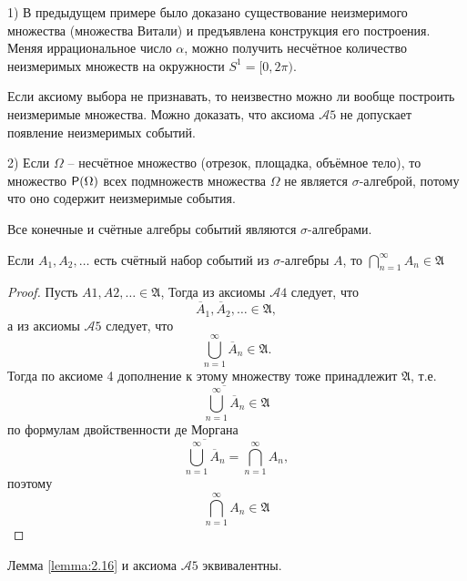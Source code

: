 \begin{zam}
	\label{zam:2.14}
1) В предыдущем примере было доказано существование неизмеримого множества (множества Витали) и предъявлена конструкция его построения. Меняя иррациональное число $\alpha$, можно получить несчётное количество неизмеримых множеств на окружности $S^1 = [0, 2\pi)$. 

Если аксиому выбора не признавать, то неизвестно можно ли вообще построить неизмеримые множества. Можно доказать, что аксиома $\mathcal{A}5$ не допускает появление неизмеримых событий.

2) Если $\Omega$ -- несчётное множество (отрезок, площадка, объёмное тело), то множество $\P(\Omega)$ всех подмножеств множества $\Omega$ не является $\sigma$-алгеброй, потому что оно содержит неизмеримые события.
\end{zam}

\begin{zam}
	\label{zam:2.15}
Все конечные и счётные алгебры событий являются $\sigma$-алгебрами.
\end{zam}

\begin{lemma}
	\label{lemma:2.16}
Если ${A_1 , A_2 , \ldots }$ есть счётный набор событий из $\sigma$-алгебры $A$, то $\bigcap\limits_{n=1}^\infty A_n\in\mathfrak{A}$
\end{lemma}

\begin{proof}
Пусть $A1 , A2 , \ldots \in \mathfrak{A}$, Тогда из аксиомы $\mathcal{A}4$ следует, что
	\begin{equation*}
		\overline{A}_1,\overline{A}_2, \ldots \in \mathfrak{A},
	\end{equation*}
а из аксиомы $\mathcal{A}5$ следует, что
	\begin{equation*}
		\bigcup\limits_{n=1}^\infty \overline{A}_n\in\mathfrak{A}.
	\end{equation*} 
Тогда по аксиоме 4 дополнение к этому множеству тоже принадлежит $\mathfrak{A}$, т.е. 
	\begin{equation*}
		\overline{\bigcup\limits_{n=1}^\infty \overline{A}_n}\in\mathfrak{A}
	\end{equation*}
по формулам двойственности де Моргана
	\begin{equation*}
		\overline{\bigcup\limits_{n=1}^\infty \overline{A}_n}=\bigcap\limits_{n=1}^\infty {A}_n,
	\end{equation*} 
поэтому
	\begin{equation*}
		\bigcap\limits_{n=1}^\infty {A}_n\in\mathfrak{A}
	\end{equation*}

\end{proof}

\begin{consq}
	\label{lemma:2.17}
	Лемма \ref{lemma:2.16} и аксиома $\mathcal{A}5$ эквивалентны.
\end{consq}